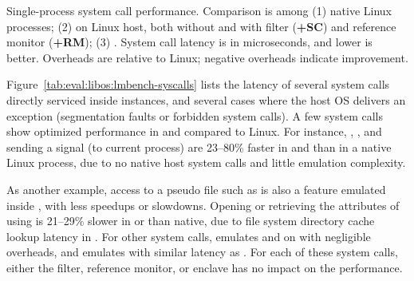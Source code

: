 \label{sec:eval:libos:syscalls}


\begin{table}[t!b!]

\caption{Single-process system call performance. Comparison is among (1) native Linux processes; (2) \graphene{} on Linux host, both without and with \seccomp{} filter ({\bf +SC}) and reference monitor ({\bf +RM}); (3) \graphenesgx{}.
System call latency is in microseconds, and lower is better.
Overheads are relative to Linux; negative overheads indicate improvement.} 
\label{tab:eval:libos:lmbench-syscalls}
\end{table}


Figure~\ref{tab:eval:libos:lmbench-syscalls}
lists the latency of several system calls directly serviced inside \thelibos{} instances,
and several cases where the host OS delivers an exception
(segmentation faults or forbidden system calls).
A few system calls show optimized performance
in \graphene{} and \graphenesgx{} compared to Linux.
For instance,
, , and sending a  signal (to current process)
are 23--80\% faster in \graphene{} and \graphenesgx{} than in a native Linux process,
due to no native host system calls and little emulation complexity.



As another example, access to a pseudo file
such as 
is also a feature emulated
inside \thelibos{},
with less speedups or slowdowns.
Opening 
or retrieving the attributes of  using 
is 21--29\% slower in \graphene{} or \graphenesgx{} than native,
due to file system directory cache lookup latency
in \thelibos{}.
For other system calls, \thelibos{} emulates  and 
on 
with negligible overheads,
and emulates  with
similar latency as .
For each of these system calls, either the \seccomp{} filter, reference monitor, or enclave
has no impact on the performance.


